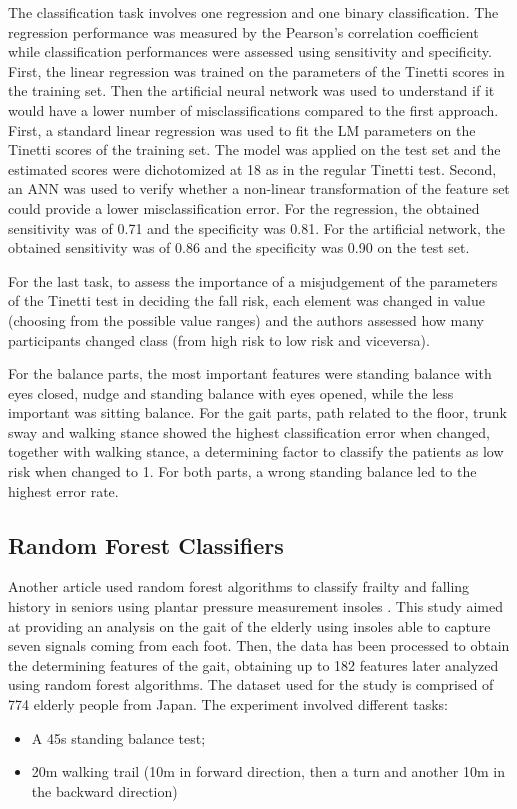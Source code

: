 The classification task involves one regression and one binary classification. The regression performance was measured by the Pearson's correlation coefficient while classification performances were assessed using sensitivity and specificity.
First, the linear regression was trained on the parameters of the Tinetti scores in the training set. Then the artificial neural network was used to understand if it would have a lower number of misclassifications compared to the first approach. 
First, a standard linear regression was used to fit the LM parameters
on the Tinetti scores of the training set. The model was applied on the
test set and the estimated scores were dichotomized at 18 as in the
regular Tinetti test.
Second, an ANN was used to verify whether a non-linear transformation of the feature set could provide a lower misclassification error.
For the regression, the obtained sensitivity was of 0.71 and the specificity was 0.81.
For the artificial network, the obtained sensitivity was of 0.86 and the specificity was 0.90 on the test set.

For the last task, to assess the importance of a misjudgement of the parameters of the Tinetti test in deciding the fall risk, each element was changed in value (choosing from the possible value ranges) and the authors assessed how many participants changed class (from high risk to low risk and viceversa).  

For the balance parts, the most important features were standing balance
with eyes closed, nudge and standing balance with eyes opened, while the less important was sitting balance.
For the gait parts, path related to the floor, trunk sway and walking stance showed the highest classification error when changed, together with walking stance, a determining factor to classify the patients as low risk when changed to 1.
For both parts, a wrong standing balance led to the highest error rate.

\subsection{Random Forest Classifiers}
Another article used random forest algorithms to classify frailty and falling history in seniors using plantar pressure measurement insoles \cite{RandomForestInsoles}. This study aimed at providing an analysis on the gait of the elderly using insoles able to capture seven signals coming from each foot. Then, the data has been processed to obtain the determining features of the gait, obtaining up to 182 features later analyzed using random forest algorithms. 
The dataset used for the study is comprised of 774 elderly people from Japan. 
The experiment involved different tasks:
\begin{itemize}
    \item A 45s standing balance test;
    \item 20m walking trail (10m in forward direction, then a turn and another 10m in the backward direction)
\end{itemize}

